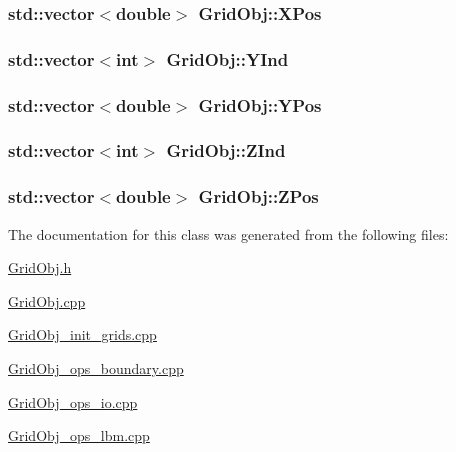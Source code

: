 \subsubsection[{\texorpdfstring{X\+Pos}{XPos}}]{\setlength{\rightskip}{0pt plus 5cm}std\+::vector$<$double$>$ Grid\+Obj\+::\+X\+Pos}\hypertarget{class_grid_obj_af31df133bf9419da6222a0dbb4e54bab}{}\label{class_grid_obj_af31df133bf9419da6222a0dbb4e54bab}
\subsubsection[{\texorpdfstring{Y\+Ind}{YInd}}]{\setlength{\rightskip}{0pt plus 5cm}std\+::vector$<$int$>$ Grid\+Obj\+::\+Y\+Ind}\hypertarget{class_grid_obj_acf1d07b290887f0d380d046a1d698f0e}{}\label{class_grid_obj_acf1d07b290887f0d380d046a1d698f0e}
\subsubsection[{\texorpdfstring{Y\+Pos}{YPos}}]{\setlength{\rightskip}{0pt plus 5cm}std\+::vector$<$double$>$ Grid\+Obj\+::\+Y\+Pos}\hypertarget{class_grid_obj_a2bd4e9b575377b8e76e5ebe7a3a31194}{}\label{class_grid_obj_a2bd4e9b575377b8e76e5ebe7a3a31194}
\subsubsection[{\texorpdfstring{Z\+Ind}{ZInd}}]{\setlength{\rightskip}{0pt plus 5cm}std\+::vector$<$int$>$ Grid\+Obj\+::\+Z\+Ind}\hypertarget{class_grid_obj_aef85a27cb2bca6b268469ee96470bb35}{}\label{class_grid_obj_aef85a27cb2bca6b268469ee96470bb35}
\subsubsection[{\texorpdfstring{Z\+Pos}{ZPos}}]{\setlength{\rightskip}{0pt plus 5cm}std\+::vector$<$double$>$ Grid\+Obj\+::\+Z\+Pos}\hypertarget{class_grid_obj_af859d35bf0a03cee8965ce3e22e651c6}{}\label{class_grid_obj_af859d35bf0a03cee8965ce3e22e651c6}


The documentation for this class was generated from the following files\+:\begin{DoxyCompactItemize}
\item 
\hyperlink{_grid_obj_8h}{Grid\+Obj.\+h}\item 
\hyperlink{_grid_obj_8cpp}{Grid\+Obj.\+cpp}\item 
\hyperlink{_grid_obj__init__grids_8cpp}{Grid\+Obj\+\_\+init\+\_\+grids.\+cpp}\item 
\hyperlink{_grid_obj__ops__boundary_8cpp}{Grid\+Obj\+\_\+ops\+\_\+boundary.\+cpp}\item 
\hyperlink{_grid_obj__ops__io_8cpp}{Grid\+Obj\+\_\+ops\+\_\+io.\+cpp}\item 
\hyperlink{_grid_obj__ops__lbm_8cpp}{Grid\+Obj\+\_\+ops\+\_\+lbm.\+cpp}\end{DoxyCompactItemize}
